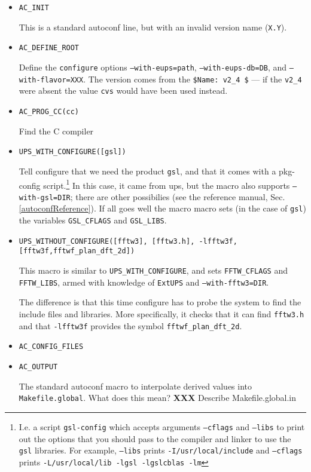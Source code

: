 \documentclass{article}
\newcommand{\XXX}[1]{\textbf{XXX} #1}
\newcommand{\code}[1]{\texttt{#1}}
\newcommand{\file}[1]{\texttt{#1}}
\newcommand{\eups}{\code{ExtUPS}}
\begin{document}
\begin{itemize}
  \item{\code{AC\_INIT}}

    This is a standard autoconf line, but with an invalid version name (\code{X.Y}).

  \item{\code{AC\_DEFINE\_ROOT}}

    Define the \code{configure} options \code{--with-eups=path},
    \code{--with-eups-db=DB}, and \code{--with-flavor=XXX}. The
    version comes from the \code{\${Name}: v2\_4 \$} --- if the
    \code{v2\_4} were absent the value \code{cvs} would have been used
    instead.

  \item\code{AC\_PROG\_CC(cc)}

    Find the C compiler    

  \item\code{UPS\_WITH\_CONFIGURE([gsl])}

    Tell configure that we need the product \code{gsl}, and that it
    comes with a pkg-config script.\footnote{%
      I.e. a script \code{gsl-config} which accepts arguments \code{--cflags}
      and \code{--libs} to print out the options that you should pass to the
      compiler and linker to use the \code{gsl} libraries. For example,
      \code{--libs} prints \code{-I/usr/local/include} and
      \code{--cflags} prints \code{-L/usr/local/lib -lgsl -lgslcblas -lm}
      }
    In this case, it came from ups,
    but the macro also supports \code{--with-gsl=DIR}; there are
    other possibilies (see the reference manual,
    Sec. \ref{autoconfReference}).  If all goes well the macro macro sets (in the
    case of \code{gsl}) the variables \code{GSL\_CFLAGS} and \code{GSL\_LIBS}.

  \item\code{UPS\_WITHOUT\_CONFIGURE([fftw3], [fftw3.h], -lfftw3f, [fftw3f,fftwf\_plan\_dft\_2d])}

    This macro is similar to \code{UPS\_WITH\_CONFIGURE}, and sets
    \code{FFTW\_CFLAGS} and \code{FFTW\_LIBS}, armed with knowledge of
    \eups{} and  \code{--with-fftw3=DIR}.

    The difference is that this time configure has to probe the system
    to find the include files and libraries.  More specifically, it
    checks that it can find \code{fftw3.h} and that \code{-lfftw3f} provides the symbol
    \code{fftwf\_plan\_dft\_2d}.
    
  \item\code{AC\_CONFIG\_FILES}
  \item\code{AC\_OUTPUT}

    The standard autoconf macro to interpolate derived values
    into \file{Makefile.global}.  What does this mean?
    \XXX{Describe Makefile.global.in}
\end{itemize}
\end{document}
